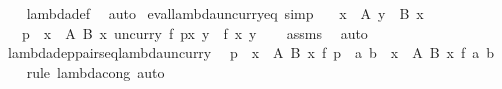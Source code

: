 \begin{isabellebody}
%
\isadelimproof
\ \ %
\endisadelimproof
%
\isatagproof
{}\isamarkupfalse%
\ lambda{\isacharunderscore}{\kern0pt}def\ \isamarkupfalse%
\ auto%
\endisatagproof
{\isafoldproof}%
%
\isadelimproof
\isanewline
%
\endisadelimproof
\isanewline
{}\isamarkupfalse%
\ eval{\isacharunderscore}{\kern0pt}lambda{\isacharunderscore}{\kern0pt}uncurry{\isacharunderscore}{\kern0pt}eq\ {\isacharbrackleft}{\kern0pt}simp{\isacharbrackright}{\kern0pt}{\isacharcolon}{\kern0pt}\isanewline
\ \ \ {\isachardoublequoteopen}x\ {\isasymin}\ A{\isachardoublequoteclose}\ {\isachardoublequoteopen}y\ {\isasymin}\ B\ x{\isachardoublequoteclose}\isanewline
\ \ \ {\isachardoublequoteopen}{\isacharparenleft}{\kern0pt}{\isasymlambda}p\ {\isasymin}\ {\isasymSum}x\ {\isasymin}\ A{\isachardot}{\kern0pt}\ {\isacharparenleft}{\kern0pt}B\ x{\isacharparenright}{\kern0pt}{\isachardot}{\kern0pt}\ uncurry\ f\ p{\isacharparenright}{\kern0pt}{\isacharbackquote}{\kern0pt}{\isasymlangle}x{\isacharcomma}{\kern0pt}\ y{\isasymrangle}\ {\isacharequal}{\kern0pt}\ f\ x\ y{\isachardoublequoteclose}\isanewline
%
\isadelimproof
\ \ %
\endisadelimproof
%
\isatagproof
{}\isamarkupfalse%
\ assms\ \isamarkupfalse%
\ auto%
\endisatagproof
{\isafoldproof}%
%
\isadelimproof
\isanewline
%
\endisadelimproof
\isanewline
{}\isamarkupfalse%
\ lambda{\isacharunderscore}{\kern0pt}dep{\isacharunderscore}{\kern0pt}pairs{\isacharunderscore}{\kern0pt}eq{\isacharunderscore}{\kern0pt}lambda{\isacharunderscore}{\kern0pt}uncurry{\isacharcolon}{\kern0pt}\isanewline
\ \ {\isachardoublequoteopen}{\isacharparenleft}{\kern0pt}{\isasymlambda}p\ {\isasymin}\ {\isasymSum}x\ {\isasymin}\ A{\isachardot}{\kern0pt}\ {\isacharparenleft}{\kern0pt}B\ x{\isacharparenright}{\kern0pt}{\isachardot}{\kern0pt}\ f\ p{\isacharparenright}{\kern0pt}\ {\isacharequal}{\kern0pt}\ {\isacharparenleft}{\kern0pt}{\isasymlambda}{\isasymlangle}a{\isacharcomma}{\kern0pt}\ b{\isasymrangle}\ {\isasymin}\ {\isasymSum}x\ {\isasymin}\ A{\isachardot}{\kern0pt}\ {\isacharparenleft}{\kern0pt}B\ x{\isacharparenright}{\kern0pt}{\isachardot}{\kern0pt}\ f\ {\isasymlangle}a{\isacharcomma}{\kern0pt}\ b{\isasymrangle}{\isacharparenright}{\kern0pt}{\isachardoublequoteclose}\isanewline
%
\isadelimproof
\ \ %
\endisadelimproof
%
\isatagproof
{}\isamarkupfalse%
\ {\isacharparenleft}{\kern0pt}rule\ lambda{\isacharunderscore}{\kern0pt}cong{\isacharparenright}{\kern0pt}\ auto%
\endisatagproof
{\isafoldproof}%
%
\isadelimproof
\isanewline
%
\endisadelimproof

\end{isabellebody}

